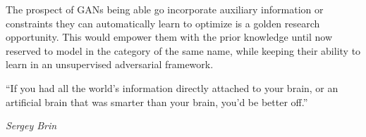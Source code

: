\footnotesize
{}
\begin{tcolorbox}[
    arc=0mm, 
    colback=cadmiumgreen!10!white, 
    coltext=cadmiumgreen!90!black,  
    colframe=cadmiumgreen!90!black,
    colbacktitle=cadmiumgreen!80,
    leftrule=3mm,
    rightrule=0mm, 
    toprule=0mm, 
    bottomrule=0mm, 
    box align=top]
    
The prospect of GANs being able go incorporate auxiliary information or constraints they  can automatically learn to optimize is  a golden research opportunity. This would empower them with the prior knowledge until now reserved to model in the category of the same name, while keeping their  ability to learn in an unsupervised adversarial framework.

\end{tcolorbox}
\hfill
\begin{tcolorbox}[tcbox width=auto, 
    arc=0mm, 
    colback=white, 
    coltext=cadmiumgreen, 
    boxrule=0pt, 
    colframe=white,
    box align=top]

\epigraph{“If you had all the world’s information directly attached to your brain, or an artificial brain that was smarter than your brain, you’d be better off.”}{\textit{Sergey Brin}}

\end{tcolorbox}
\normalsize